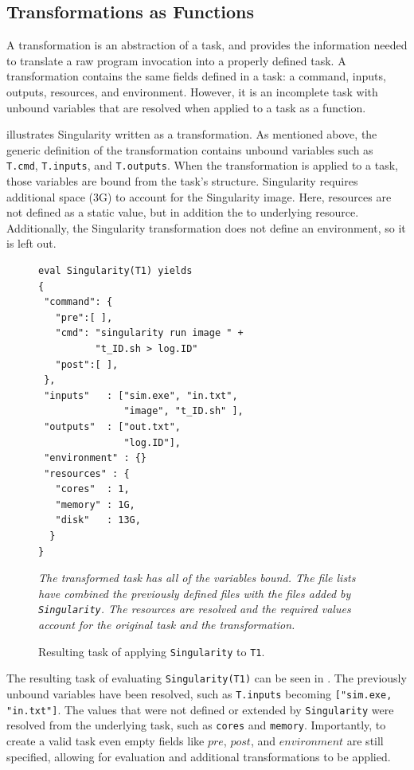 \documentclass[conference]{IEEEtran}
\begin{document}
\subsection{Transformations as Functions}

A transformation is an abstraction of a task,
and provides the information needed
to translate a raw program invocation into 
a properly defined task. 
A transformation contains the same fields defined in a task: 
a command, inputs, outputs, 
resources, and environment.
However, it is an incomplete task with 
unbound variables that are resolved 
when applied to a task as a function.

 illustrates  
Singularity written as a transformation.
As mentioned above, the generic definition of
the transformation contains unbound variables
such as {\tt T.cmd}, {\tt T.inputs}, and
{\tt T.outputs}. 
When the transformation is 
applied to a task, those variables
are bound from the task's structure.
Singularity requires
additional space (3G) to account 
for the Singularity image. 
Here, resources are not defined as
a static value, but in addition the to 
underlying resource. 
Additionally, the Singularity transformation 
does not
define an environment, so it is left out. 


\begin{figure}[t]
\begin{framed}
\begin{verbatim}
eval Singularity(T1) yields
{
 "command": {
   "pre":[ ],
   "cmd": "singularity run image " +
          "t_ID.sh > log.ID"
   "post":[ ],
 },
 "inputs"   : ["sim.exe", "in.txt", 
               "image", "t_ID.sh" ],
 "outputs"  : ["out.txt", 
               "log.ID"],
 "environment" : {}
 "resources" : {
   "cores"  : 1, 
   "memory" : 1G, 
   "disk"   : 13G,
  }
}
\end{verbatim}
\end{framed}
\caption{Resulting task of applying {\tt Singularity} to {\tt T1}.}
\small
\emph{The transformed task has all of the variables bound.
The file lists have combined the previously defined files
with the files added by {\tt Singularity}.
The resources are resolved and the required values account
for the original task and the transformation.}
\label{sing-task}
\end{figure}


The resulting task of evaluating 
\verb$Singularity(T1)$
can be seen in .
The previously unbound variables have
been resolved, such as {\tt T.inputs}
becoming {\tt ["sim.exe, "in.txt"]}.
The values that were not defined or
extended by \verb$Singularity$ were
resolved from the underlying task,
such as {\tt cores} and {\tt memory}.
Importantly, to create a valid task
even empty fields like $pre$, $post$,
and $environment$ are still specified, 
allowing for evaluation and additional
transformations to be applied.
\end{document}
